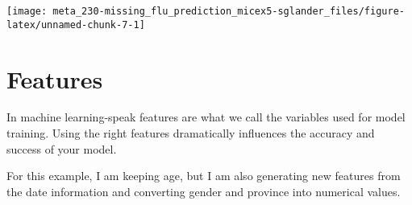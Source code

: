 \documentclass[]{book}
\newenvironment{Shaded}{\begin{snugshade}}{\end{snugshade}}
\newcommand{\ControlFlowTok}[1]{\textcolor[rgb]{0.13,0.29,0.53}{\textbf{#1}}}
\newcommand{\DataTypeTok}[1]{\textcolor[rgb]{0.13,0.29,0.53}{#1}}
\newcommand{\KeywordTok}[1]{\textcolor[rgb]{0.13,0.29,0.53}{\textbf{#1}}}
\newcommand{\NormalTok}[1]{#1}
\newcommand{\OperatorTok}[1]{\textcolor[rgb]{0.81,0.36,0.00}{\textbf{#1}}}
\newcommand{\StringTok}[1]{\textcolor[rgb]{0.31,0.60,0.02}{#1}}
\begin{document}
\begin{center}\texttt{[image: meta\_230-missing\_flu\_prediction\_micex5-sglander\_files/figure-latex/unnamed-chunk-7-1]} \end{center}

\hypertarget{features}{%
\section{Features}\label{features}}

In machine learning-speak features are what we call the variables used for model training. Using the right features dramatically influences the accuracy and success of your model.

For this example, I am keeping age, but I am also generating new features from the date information and converting gender and province into numerical values.

\begin{Shaded}
\end{Shaded}
\end{document}
